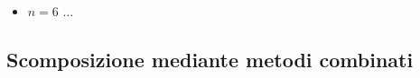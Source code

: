 \begin{itemize}[left=0mm, nosep]
\begin{itemize}[nosep]
\(x^5+a^5=(x+a)(x^4-ax^3+x^2a^2-xa^3+a^4)\)

\item \(x^5-a^5\) è divisibile per \((x-a)\) usando la regola di Ruffini
ottenendo: 

\(x^5-a^5=(x-a)(x^4+ax^3+x^2a^2+xa^3+a^4)\)

\end{itemize}

\item \(n=6\) ...

\end{itemize}

%  
% 
% 
% 
%  
% 
% 
% 
% 
% 

\subsection{Scomposizione mediante metodi combinati}
\label{subsec:divpol_metodicombinati}

